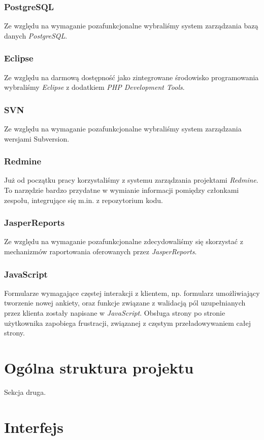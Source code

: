 \subsubsection{PostgreSQL}
Ze względu na wymaganie pozafunkcjonalne wybraliśmy system zarządzania bazą danych \emph{PostgreSQL}.
\subsubsection{Eclipse}
Ze względu na darmową dostępność jako zintegrowane środowisko programowania wybraliśmy \emph{Eclipse} z dodatkiem \emph{PHP Development Tools}.
\subsubsection{SVN}
Ze względu na wymaganie pozafunkcjonalne wybraliśmy system zarządzania wersjami Subversion.
\subsubsection{Redmine}
Już od początku pracy korzystaliśmy z systemu zarządzania projektami \emph{Redmine}. To narzędzie bardzo przydatne w wymianie informacji pomiędzy członkami zespołu, integrujące się m.in. z repozytorium kodu.
\subsubsection{JasperReports}
Ze względu na wymaganie pozafunkcjonalne zdecydowaliśmy się skorzystać z mechanizmów raportowania oferowanych przez \emph{JasperReports}.
\subsubsection{JavaScript}
Formularze wymagające częstej interakcji z klientem, np. formularz umożliwiający tworzenie nowej ankiety, oraz funkcje związane z walidacją pól uzupełnianych przez klienta zostały napisane w \emph{JavaScript}. Obsługa strony po stronie użytkownika zapobiega frustracji, związanej z częstym przeładowywaniem całej strony.

\section{Ogólna struktura projektu}
\label{Chapter63}

Sekcja druga.

\section{Interfejs}
\label{Chapter64}

